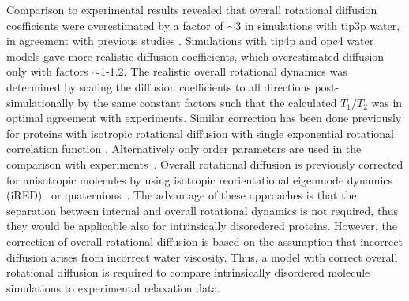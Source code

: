 \documentclass[pre,aps,floatfix,authordate1-4,twocolumn]{revtex4-1}
\begin{document}
Comparison to experimental results revealed that overall rotational diffusion
coefficients were overestimated by a factor of $\sim$3 in simulations with tip3p
water, in agreement with previous studies \cite{prompers02,wong08,anderson12}. Simulations
with tip4p and opc4 water models gave more realistic diffusion coefficients,
which overestimated diffusion only with factors $\sim$1-1.2.
The realistic overall rotational dynamics was determined by
scaling the diffusion coefficients to all directions post-simulationally by the
same constant factors such that the calculated $T_1/T_2$ was in optimal
agreement with experiments. Similar correction has been done previously
for proteins with isotropic rotational diffusion with single exponential rotational correlation
function \cite{showalter07a,showalter07b,maragakis08,gu14,allner15}.
Alternatively only order parameters are used in the comparison with
experiments~\cite{gu14,maragakis08,trbovic08,best04}.
Overall rotational diffusion is previously corrected for anisotropic
molecules by using isotropic reorientational eigenmode dynamics (iRED)~\cite{prompers02}
or quaternions~\cite{anderson12}. The advantage of these approaches is that
the separation between internal and overall rotational dynamics is not
required, thus they would be applicable also for intrinsically disoredered
proteins. However, the correction of overall rotational diffusion is based on
the assumption that incorrect diffusion arises from incorrect water viscosity.
Thus, a model with correct overall rotational diffusion is required to
compare intrinsically disordered molecule simulations to experimental
relaxation data.


\end{document}
